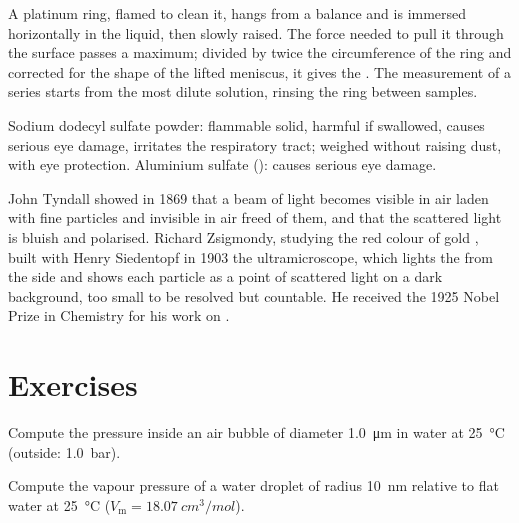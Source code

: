 \begin{inthelab}
A platinum ring, flamed to clean it, hangs from a balance and is immersed
horizontally in the liquid, then slowly raised. The force needed to pull it
through the surface passes a maximum; divided by twice the circumference of
the ring and corrected for the shape of the lifted meniscus, it gives the
. The measurement of a  series starts from the most
dilute solution, rinsing the ring between samples.
\end{inthelab}

\begin{safety}{}
Sodium dodecyl sulfate powder: flammable solid, harmful if swallowed, causes
serious eye damage, irritates the respiratory tract; weighed without raising
dust, with eye protection. Aluminium sulfate (): causes serious eye
damage.
\end{safety}

\begin{history}
John Tyndall showed in 1869 that a beam of light becomes visible in air laden
with fine particles and invisible in air freed of them, and that the scattered
light is bluish and polarised. Richard Zsigmondy, studying the red colour of
gold , built with Henry Siedentopf in 1903 the ultramicroscope, which lights
the  from the side and shows each particle as a point of scattered light
on a dark background, too small to be resolved but countable. He received the
1925 Nobel Prize in Chemistry for his work on .
\end{history}

\section{Exercises}

\begin{exercise}[$\star$]\label{exo:b3:colloids:1}
Compute the pressure inside an air bubble of diameter \qty{1.0}{\micro m} in water at
\qty{25}{\celsius} (outside: \qty{1.0}{bar}).
\end{exercise}

\begin{exercise}[$\star$]\label{exo:b3:colloids:2}
Compute the vapour pressure of a water droplet of radius \qty{10}{nm} relative to
flat water at \qty{25}{\celsius} ($V_{\mathrm m} = \qty{18.07}{cm^3/mol}$).
\end{exercise}

